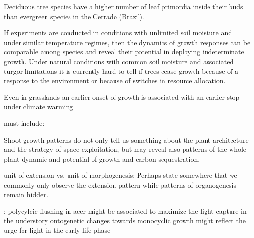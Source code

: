 \documentclass{article}
\begin{document}
Deciduous tree species have a higher number of leaf primordia inside their buds than evergreen species in the Cerrado (Brazil). 
	
If experiments are conducted in conditions with unlimited soil moisture and under similar temperature regimes, then the dynamics of growth responses can be comparable among species and reveal their potential in deploying indeterminate growth. Under natural conditions with common soil moisture and associated turgor limitations it is currently hard to tell if trees cease growth because of a response to the environment or because of switches in resource allocation. 
 
 Even in grasslands an earlier onset of growth is associated with an earlier stop under climate warming \cite{mohlGrowthAlpineGrassland2022a}
	
	
	must include: 
	
	\cite{iwasaOptimalGrowthSchedule1989}
	
	
	
	Shoot growth patterns do not only tell us something about the plant architecture and the strategy of space exploitation, but may reveal also patterns of the whole-plant dynamic and potential of growth and carbon sequestration.
	
	unit of extension vs. unit of morphogenesis: Perhaps state somewhere that we commonly only observe the extension pattern while patterns of organogenesis remain hidden. 
	
	\citep{verduEvolutionaryCorrelationsPolycyclic2007}: polycylcic flushing in acer might be associated to maximize the light capture in the understory
	ontogenetic changes towards monocyclic growth might reflect the urge for light in the early life phase
	
	
	 
	
	\newpage
	
	
	
	
	
	
\end{document}
